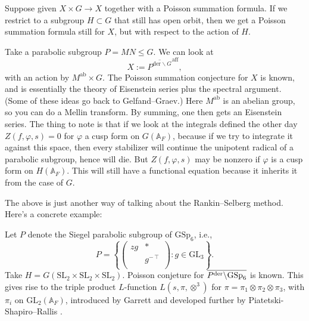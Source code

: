 \documentclass[reqno]{amsart} 
\numberwithin{theorem}{section}
\numberwithin{equation}{section}
\numberwithin{exercise}{section}
\begin{document}
Suppose given $X \times G \rightarrow X$ together with a Poisson summation formula.  If we restrict to a subgroup $H \subset G$ that still has open orbit, then we get a Poisson summation formula still for $X$, but with respect to the action of $H$.
\begin{example}\label{example:cq6ud4qj65}
  Take a parabolic subgroup $P = M N \leq G$.  We can look at
  \begin{equation*}
    X := \overline{P^{\mathrm{der} \backslash G}}^{\mathrm{aff}},
  \end{equation*}
  with an action by $M^{\mathrm{a b}} \times G$.  The Poisson summation conjecture for $X$ is known, and is essentially the theory of Eisenstein series plus the spectral argument.  (Some of these ideas go back to Gelfand--Graev.)  Here $M^{\mathrm{ab}}$ is an abelian group, so you can do a Mellin transform.  By summing, one then gets an Eisenstein series.  The thing to note is that if we look at the integrals defined the other day $Z(f, \varphi, s) = 0$ for $\varphi$ a cusp form on $G(\mathbb{A}_F)$, because if we try to integrate it against this space, then every stabilizer will continue the unipotent radical of a parabolic subgroup, hence will die.  But $Z(f, \varphi, s)$ may be nonzero if $\varphi$ is a cusp form on $H(\mathbb{A}_F)$.  This will still have a functional equation because it inherits it from the case of $G$.  \end{example}
The above is just another way of talking about the Rankin--Selberg method.  Here's a concrete example:
\begin{example}\label{example:cq6ud4qlts}
  Let $P$ denote the Siegel parabolic subgroup of $\mathrm{GSp}_6$, i.e.,
  \begin{equation*}
    P = \left\{
      \begin{pmatrix}
        z g        & \ast \\
                   & g^{- \intercal} \\
      \end{pmatrix}
      : g \in \mathrm{GL}_3\right\}.
  \end{equation*}
  Take $H = G(\mathrm{SL}_2 \times \mathrm{SL}_2 \times \mathrm{SL}_2)$.  Poisson conjeture for $\overline{P^{\operatorname{der}} \backslash \mathrm{GSp}_6}$ is known.  This gives rise to the triple product $L$-function $L(s, \pi, \otimes^3)$ for $\pi = \pi_1 \otimes \pi_2 \otimes \pi_3$, with $\pi_i$ on $\mathrm{GL}_2(\mathbb{A}_F)$, introduced by Garrett \cite{MR881269} and developed further by Piatetski-Shapiro--Rallis \cite{MR911357}.
\end{example}
\end{document}
